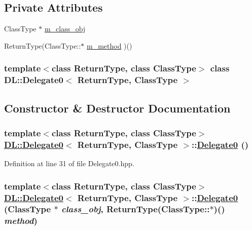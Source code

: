 \subsection*{Private Attributes}
\begin{CompactItemize}
\item 
Class\-Type $\ast$ \hyperlink{classDL_1_1Delegate0_r0}{m\_\-class\_\-obj}
\item 
Return\-Type(Class\-Type::$\ast$ \hyperlink{classDL_1_1Delegate0_r1}{m\_\-method} )()
\end{CompactItemize}
\subsubsection*{template$<$class Return\-Type, class Class\-Type$>$ class DL::Delegate0$<$ Return\-Type, Class\-Type $>$}



\subsection{Constructor \& Destructor Documentation}
\hypertarget{classDL_1_1Delegate0_d0}{
\subsubsection[Delegate0]{\setlength{\rightskip}{0pt plus 5cm}template$<$class Return\-Type, class Class\-Type$>$ \hyperlink{classDL_1_1Delegate0}{DL::Delegate0}$<$ Return\-Type, Class\-Type $>$::\hyperlink{classDL_1_1Delegate0}{Delegate0} ()}}
\label{classDL_1_1Delegate0_d0}




Definition at line 31 of file Delegate0.hpp.\hypertarget{classDL_1_1Delegate0_a0}{
\subsubsection[Delegate0]{\setlength{\rightskip}{0pt plus 5cm}template$<$class Return\-Type, class Class\-Type$>$ \hyperlink{classDL_1_1Delegate0}{DL::Delegate0}$<$ Return\-Type, Class\-Type $>$::\hyperlink{classDL_1_1Delegate0}{Delegate0} (Class\-Type $\ast$ {\em class\_\-obj}, Return\-Type(Class\-Type::$\ast$)() {\em method})}}
\label{classDL_1_1Delegate0_a0}




